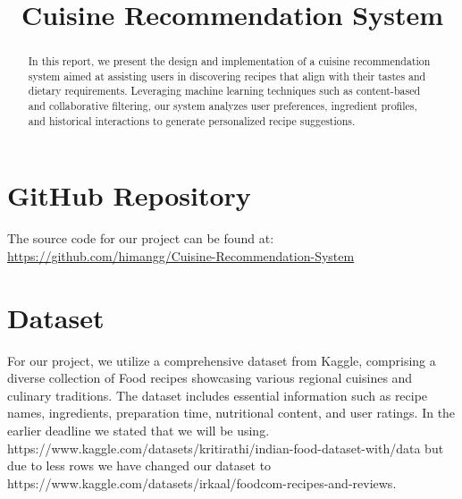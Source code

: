 \documentclass[conference]{IEEEtran}
\newcommand{\githublink}{\url{https://github.com/himangg/Cuisine-Recommendation-System}}
\begin{document}
\title{Cuisine Recommendation System}

\author{
\and
{}
}

\maketitle

\begin{abstract}
 In this report, we present the design and implementation of a cuisine recommendation system aimed at assisting users in discovering recipes that align with their tastes and dietary requirements. Leveraging machine learning techniques such as content-based and collaborative filtering, our system analyzes user preferences, ingredient profiles, and historical interactions to generate personalized recipe suggestions.
\end{abstract}

\section{GitHub Repository}
The source code for our project can be found at: \githublink

\section{Dataset}
For our project, we utilize a comprehensive dataset from Kaggle, comprising a diverse collection of Food recipes showcasing various regional cuisines and culinary traditions. The dataset includes essential information such as recipe names, ingredients, preparation time, nutritional content, and user ratings. In the earlier deadline we stated that we will be using.
https://www.kaggle.com/datasets/kritirathi/indian-food-dataset-with/data
but due to less rows we have changed our dataset to https://www.kaggle.com/datasets/irkaal/foodcom-recipes-and-reviews.
\end{document}
